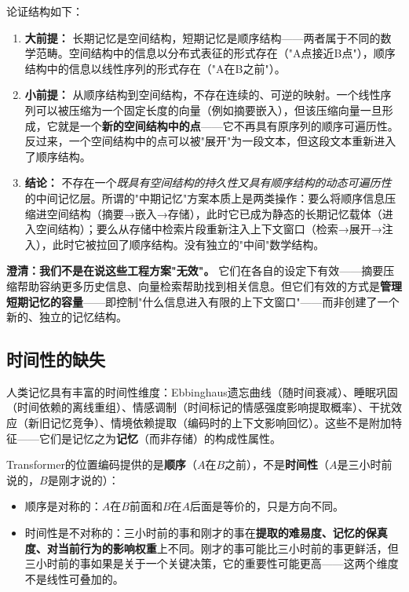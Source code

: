 \documentclass[11pt,a4paper]{ctexart}
\begin{document}
论证结构如下：

\begin{enumerate}[leftmargin=*]
    \item \textbf{大前提：} 长期记忆是空间结构，短期记忆是顺序结构——两者属于不同的数学范畴。空间结构中的信息以分布式表征的形式存在（"A点接近B点"），顺序结构中的信息以线性序列的形式存在（"A在B之前"）。
    \item \textbf{小前提：} 从顺序结构到空间结构，不存在连续的、可逆的映射。一个线性序列可以被压缩为一个固定长度的向量（例如摘要嵌入），但该压缩向量一旦形成，它就是一个\textbf{新的空间结构中的点}——它不再具有原序列的顺序可遍历性。反过来，一个空间结构中的点可以被"展开"为一段文本，但这段文本重新进入了顺序结构。
    \item \textbf{结论：} 不存在一个\textit{既具有空间结构的持久性又具有顺序结构的动态可遍历性}的中间记忆层。所谓的"中期记忆"方案本质上是两类操作：要么将顺序信息压缩进空间结构（摘要→嵌入→存储），此时它已成为静态的长期记忆载体（进入空间结构）；要么从存储中检索片段重新注入上下文窗口（检索→展开→注入），此时它被拉回了顺序结构。没有独立的"中间"数学结构。
\end{enumerate}

\textbf{澄清：我们不是在说这些工程方案"无效"。} 它们在各自的设定下有效——摘要压缩帮助容纳更多历史信息、向量检索帮助找到相关信息。但它们有效的方式是\textbf{管理短期记忆的容量}——即控制"什么信息进入有限的上下文窗口"——而非创建了一个新的、独立的记忆结构。

\subsection{时间性的缺失}

人类记忆具有丰富的时间性维度：Ebbinghaus遗忘曲线（随时间衰减）、睡眠巩固（时间依赖的离线重组）、情感调制（时间标记的情感强度影响提取概率）、干扰效应（新旧记忆竞争）、情境依赖提取（编码时的上下文影响回忆）。这些不是附加特征——它们是记忆之为\textbf{记忆}（而非存储）的构成性属性。

Transformer的位置编码提供的是\textbf{顺序}（$A$在$B$之前），不是\textbf{时间性}（$A$是三小时前说的，$B$是刚才说的）：

\begin{itemize}[leftmargin=*]
    \item 顺序是对称的：$A$在$B$前面和$B$在$A$后面是等价的，只是方向不同。
    \item 时间性是不对称的：三小时前的事和刚才的事在\textbf{提取的难易度、记忆的保真度、对当前行为的影响权重}上不同。刚才的事可能比三小时前的事更鲜活，但三小时前的事如果是关于一个关键决策，它的重要性可能更高——这两个维度不是线性可叠加的。
\end{itemize}
\end{document}
